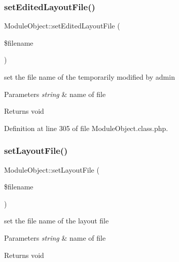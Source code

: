 \mbox{\label{classModuleObject_a28e95b299aeac82b450e6ed8b121ff05}} 
\subsubsection{\texorpdfstring{set\+Edited\+Layout\+File()}{setEditedLayoutFile()}}
{\footnotesize\ttfamily Module\+Object\+::set\+Edited\+Layout\+File (\begin{DoxyParamCaption}\item[{}]{\$filename }\end{DoxyParamCaption})}

set the file name of the temporarily modified by admin 
\begin{DoxyParams}{Parameters}
{\em string} & name of file \\
\hline
\end{DoxyParams}
\begin{DoxyReturn}{Returns}
void 
\end{DoxyReturn}


Definition at line 305 of file Module\+Object.\+class.\+php.

\mbox{\label{classModuleObject_aab99465b1bac81df148c829a3b14f933}} 
\subsubsection{\texorpdfstring{set\+Layout\+File()}{setLayoutFile()}}
{\footnotesize\ttfamily Module\+Object\+::set\+Layout\+File (\begin{DoxyParamCaption}\item[{}]{\$filename }\end{DoxyParamCaption})}

set the file name of the layout file 
\begin{DoxyParams}{Parameters}
{\em string} & name of file \\
\hline
\end{DoxyParams}
\begin{DoxyReturn}{Returns}
void 
\end{DoxyReturn}


